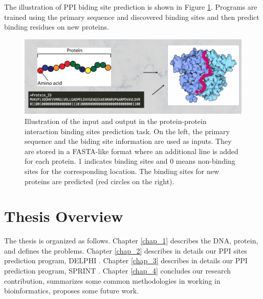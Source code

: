 The illustration of PPI biding site prediction is shown in Figure \ref{fig_ppi_bind_work_flow}. Programs are trained using the primary sequence and discovered binding sites and then predict binding residues on new proteins.
\begin{figure}[h!]
\begin{center}
\includegraphics[width = 15cm]{img/PPI_site_pred_input.png}
\end{center}
\caption[Illustration of protein-protein interaction binding sites prediction]{Illustration of the input and output in the protein-protein interaction binding sites prediction task. On the left, the primary sequence and the biding site information are used as inputs. They are stored in a FASTA-like format where an additional line is added for each protein. 1 indicates binding sites and 0 means non-binding sites for the corresponding location. The binding sites for new proteins are predicted (red circles on the right). \label{fig_ppi_bind_work_flow}}
\end{figure}

\section{Thesis Overview}
The thesis is organized as follows. Chapter \ref{chap_1} describes the DNA, protein, and defines the problems. Chapter \ref{chap_2} describes in details our PPI sites prediction program, DELPHI \cite{li2020delphi}. Chapter \ref{chap_3} describes in details our PPI prediction program, SPRINT \cite{li2017sprint, li2020predicting}. Chapter \ref{chap_4} concludes our research contribution, summarizes some common methodologies in working in bioinformatics, proposes some future work.
